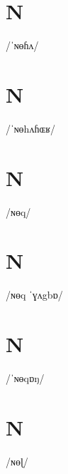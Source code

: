 \documentclass[10pt,a4paper,twoside]{book}
\begin{document}
\section*{N}

\begin{multicols}{3}
 {/ˈɴɵɦʌ/} {}
\end{multicols}

\section*{N}

\begin{multicols}{3}
 {/ˈɴɵhʌɦɶʁ/} {}
\end{multicols}

\section*{N}

\begin{multicols}{3}
 {/ɴɵq/} {}
\end{multicols}

\section*{N}

\begin{multicols}{3}
 {/ɴɵq ˈɣʌgbɒ/} {}
\end{multicols}

\section*{N}

\begin{multicols}{3}
 {/ˈɴɵqɒŋ/} {}
\end{multicols}

\section*{N}

\begin{multicols}{3}
 {/ɴɵɭ/} {}
\end{multicols}
\end{document}
